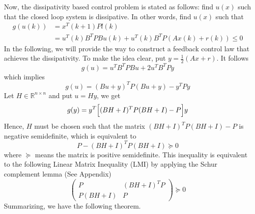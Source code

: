 \documentclass[trsc,nonblindrev]{informs3} %
\renewcommand{\vec}[1]{#1}
\newcommand{\mat}[1]{#1}
\begin{document}
Now, the dissipativity based control problem is stated as follows:
find $\vec{u}(x)$ such that the closed loop system is dissipative. In
other words, find $\vec{u}(x)$ such that
\begin{align}\label{pbc0}
g(\vec{u}(k))&=\vec{x}^T(k+1)\mat{P}\vec{l}(k)\nonumber\\
&=\vec{u}^T(k)\mat{B}^T\mat{P}\mat{B}\vec{u}(k)
+\vec{u}^T(k)\mat{B}^T\mat{P}(\mat{A}\vec{x}(k)+\vec{r}(k))\leq 0
\end{align}
In the following, we will provide the way to construct a feedback
control law that achieves the dissipativity. To make the idea clear,
put $\vec{y}=\frac{1}{2}(\mat{A}\vec{x}+\vec{r})$. It follows 
\begin{equation}\label{pbc}
g(\vec{u})=\vec{u}^T\mat{B}^T\mat{P}\mat{B}\vec{u}+2\vec{u}^T\mat{B}^T\mat{P}\vec{y}
\end{equation}
which implies
$$g(\vec{u})=(\mat{B}\vec{u}
+\vec{y})^T \mat{P} (\mat{B}\vec{u}
+\vec{y})-\vec{y}^T
\mat{P}\vec{y}$$
Let $\mat{H}\in\mathbb{R}^{n\times n}$ and put
$\vec{u}=\mat{H}\vec{y}$, we get
$$g(\vec{y})= \vec{y}^T\Bigl[(\mat{B}\mat{H}+\mat{I})^T \mat{P}
(\mat{B}\mat{H}+\mat{I})-\mat{P}\Bigr]\vec{y}
$$
Hence, $\mat{H}$ must be chosen such that the matrix
$(\mat{B}\mat{H}+\mat{I})^T \mat{P}
(\mat{B}\mat{H}+\mat{I})-\mat{P}$ is negative
semidefinite, which is equivalent to
$$\mat{P}-(\mat{B}\mat{H}+\mat{I})^T \mat{P}
(\mat{B}\mat{H}+\mat{I})\succeq 0$$
where $\succeq$ means the matrix is positive semidefinite.
This inequality is equivalent to the following Linear Matrix
Inequality (LMI) by applying the Schur
complement lemma (See Appendix)
$$\begin{pmatrix}
\mat{P}& (\mat{B}\mat{H}+\mat{I})^T \mat{P} \\
\mat{P} (\mat{B}\mat{H}+\mat{I})  & \mat{P}
\end{pmatrix}\succeq 0$$
Summarizing, we have the following theorem. 
\end{document}
